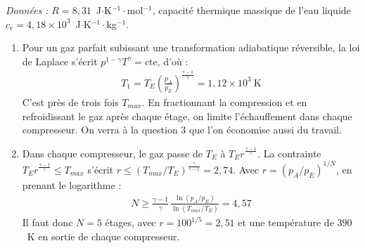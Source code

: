 \textit{Données :} $R=8{,}31$~J$\cdot$K$^{-1}\cdot$mol$^{-1}$, capacité thermique massique de l'eau liquide $c_e=4{,}18\times10^{3}$~J$\cdot$K$^{-1}\cdot$kg$^{-1}$.

\newpage

\begin{correction}

\begin{enumerate}

	\item Pour un gaz parfait subissant une transformation adiabatique réversible, la loi de Laplace s'écrit $p^{1-\gamma}T^{\gamma}=\text{cte}$, d'où :
	\begin{align*}
		\boxed{T_1=T_E\left(\frac{p_A}{p_E}\right)^{\frac{\gamma-1}{\gamma}}}=1{,}12\times10^{3}~\text{K}
	\end{align*}
	C'est près de trois fois $T_{max}$. En fractionnant la compression et en refroidissant le gaz après chaque étage, on limite l'échauffement dans chaque compresseur. On verra à la question 3 que l'on économise aussi du travail.

	\item Dans chaque compresseur, le gaz passe de $T_E$ à $T_Er^{\frac{\gamma-1}{\gamma}}$. La contrainte $T_Er^{\frac{\gamma-1}{\gamma}}\leqslant T_{max}$ s'écrit $r\leqslant\left(T_{max}/T_E\right)^{\frac{\gamma}{\gamma-1}}=2{,}74$. Avec $r=(p_A/p_E)^{1/N}$, en prenant le logarithme :
	\begin{align*}
		\boxed{N\geqslant\frac{\gamma-1}{\gamma}\,\frac{\ln(p_A/p_E)}{\ln(T_{max}/T_E)}}=4{,}57
	\end{align*}
	Il faut donc $N=5$ étages, avec $r=100^{1/5}=2{,}51$ et une température de $390$~K en sortie de chaque compresseur.


\end{enumerate}
\end{correction}
